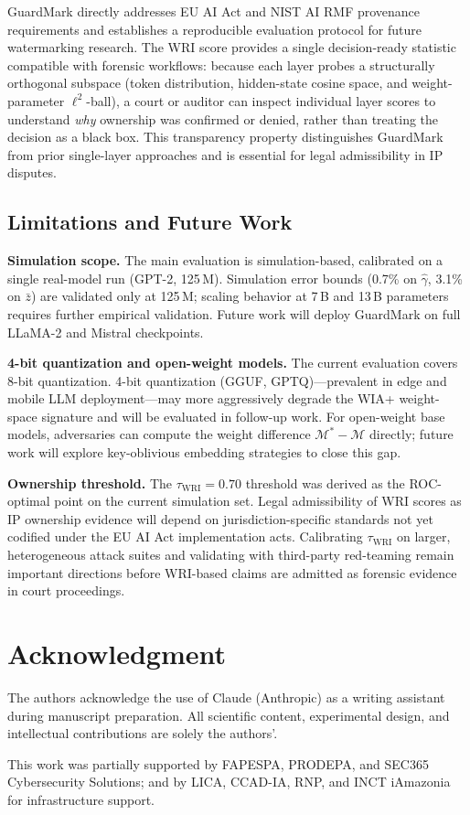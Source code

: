 \documentclass[conference]{IEEEtran}
\newcommand{\M}{\mathcal{M}}
\newcommand{\WRI}{\mathrm{WRI}}
\begin{document}
GuardMark directly addresses EU AI Act and NIST AI RMF provenance requirements
and establishes a reproducible evaluation protocol for future watermarking
research. The WRI score provides a single decision-ready statistic compatible
with forensic workflows: because each layer probes a structurally orthogonal
subspace (token distribution, hidden-state cosine space, and weight-parameter
$\ell^2$-ball), a court or auditor can inspect individual layer scores
to understand \emph{why} ownership was confirmed or denied, rather than
treating the decision as a black box. This transparency property distinguishes
GuardMark from prior single-layer approaches and is essential for legal
admissibility in IP disputes.

\subsection{Limitations and Future Work}

\textbf{Simulation scope.} The main evaluation is simulation-based,
calibrated on a single real-model run (GPT-2, 125\,M). Simulation error
bounds (0.7\% on $\hat{\gamma}$, 3.1\% on $\bar{z}$) are validated only at
125\,M; scaling behavior at 7\,B and 13\,B parameters requires further
empirical validation. Future work will deploy GuardMark on full LLaMA-2
and Mistral checkpoints.

\textbf{4-bit quantization and open-weight models.} The current evaluation
covers 8-bit quantization. 4-bit quantization (GGUF, GPTQ)---prevalent in
edge and mobile LLM deployment---may more aggressively degrade the WIA+
weight-space signature and will be evaluated in follow-up work.
For open-weight base models, adversaries can compute the weight difference
$\M^*-\M$ directly; future work will explore key-oblivious embedding
strategies to close this gap.

\textbf{Ownership threshold.} The $\tau_{\WRI}=0.70$ threshold was derived
as the ROC-optimal point on the current simulation set. Legal admissibility
of WRI scores as IP ownership evidence will depend on jurisdiction-specific
standards not yet codified under the EU AI Act implementation acts.
Calibrating $\tau_{\WRI}$ on larger, heterogeneous attack suites and
validating with third-party red-teaming remain important directions before
WRI-based claims are admitted as forensic evidence in court proceedings.

\section*{Acknowledgment}
\small
The authors acknowledge the use of Claude (Anthropic) as a writing assistant
during manuscript preparation. All scientific content, experimental design,
and intellectual contributions are solely the authors'.

This work was partially supported by FAPESPA, PRODEPA, and SEC365
Cybersecurity Solutions; and by LICA, CCAD-IA, RNP, and INCT iAmazonia for
infrastructure support.

\balance


\end{document}
